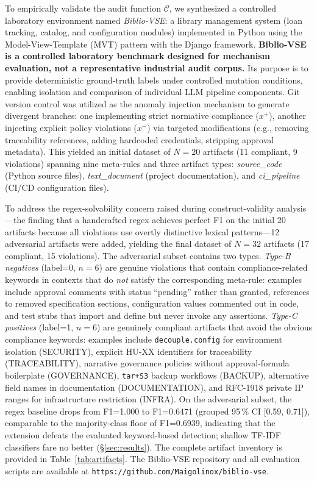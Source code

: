\documentclass{ieeeaccess}
\begin{document}
To empirically validate the audit function $\mathcal{C}$, we synthesized a controlled laboratory environment named \textit{Biblio-VSE}: a library management system (loan tracking, catalog, and configuration modules) implemented in Python using the Model-View-Template (MVT) pattern with the Django framework. \textbf{Biblio-VSE is a controlled laboratory benchmark designed for mechanism evaluation, not a representative industrial audit corpus.} Its purpose is to provide deterministic ground-truth labels under controlled mutation conditions, enabling isolation and comparison of individual LLM pipeline components. Git version control was utilized as the anomaly injection mechanism to generate divergent branches: one implementing strict normative compliance ($x^+$), another injecting explicit policy violations ($x^-$) via targeted modifications (e.g., removing traceability references, adding hardcoded credentials, stripping approval metadata). This yielded an initial dataset of $N=20$ artifacts (11 compliant, 9 violations) spanning nine meta-rules and three artifact types: \textit{source\_code} (Python source files), \textit{text\_document} (project documentation), and \textit{ci\_pipeline} (CI/CD configuration files).

To address the regex-solvability concern raised during construct-validity analysis---the finding that a handcrafted regex achieves perfect F1 on the initial 20 artifacts because all violations use overtly distinctive lexical patterns---12 adversarial artifacts were added, yielding the final dataset of $N=32$ artifacts (17 compliant, 15 violations). The adversarial subset contains two types. \textit{Type-B negatives} (label=0, $n=6$) are genuine violations that contain compliance-related keywords in contexts that do \emph{not} satisfy the corresponding meta-rule: examples include approval comments with status ``pending'' rather than granted, references to removed specification sections, configuration values commented out in code, and test stubs that import and define but never invoke any assertions. \textit{Type-C positives} (label=1, $n=6$) are genuinely compliant artifacts that avoid the obvious compliance keywords: examples include \texttt{decouple.config} for environment isolation (SECURITY), explicit HU-XX identifiers for traceability (TRACEABILITY), narrative governance policies without approval-formula boilerplate (GOVERNANCE), \texttt{tar+S3} backup workflows (BACKUP), alternative field names in documentation (DOCUMENTATION), and RFC-1918 private IP ranges for infrastructure restriction (INFRA). On the adversarial subset, the regex baseline drops from F1=1.000 to F1=0.6471 (grouped 95\,\% CI [0.59, 0.71]), comparable to the majority-class floor of F1=0.6939, indicating that the extension defeats the evaluated keyword-based detection; shallow TF-IDF classifiers fare no better (§\ref{sec:results}). The complete artifact inventory is provided in Table~\ref{tab:artifacts}. The Biblio-VSE repository and all evaluation scripts are available at \texttt{https://github.com/Maigolinox/biblio-vse}.
\end{document}
